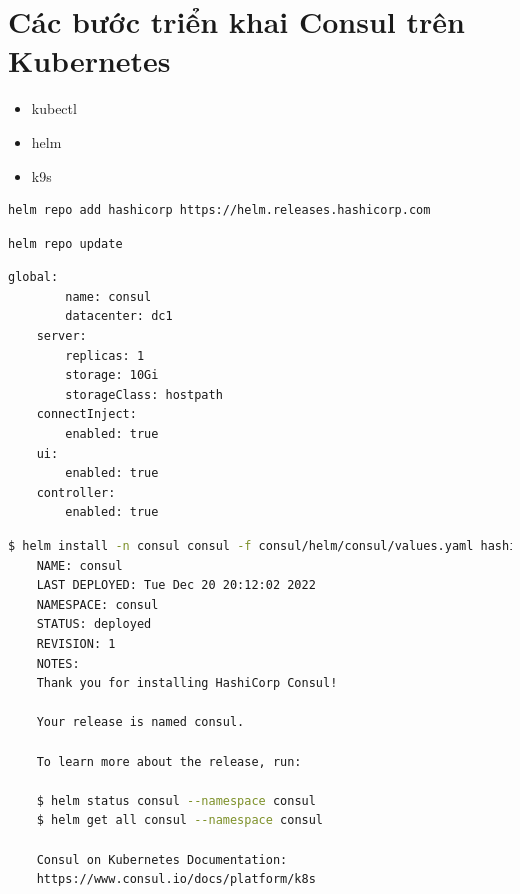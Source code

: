 \documentclass[14pt,a4paper]{report}
\begin{document}
{	\section{Các bước triển khai Consul trên Kubernetes}
	\hspace{1.0cm}{Để triển khai Consul trên Kubernetes, chúng ta sẽ cần phải có những công cụ sau đây:\\}
	\begin{itemize}
		\item kubectl
		\item helm
		\item k9s
	\end{itemize}
	\hspace{0.3cm}{Dưới đây là các câu lệnh để triển khai Consul, chúng ta sẽ sử dụng Chart của Hashicorp cung cấp. Đầu tiên, chúng ta cần phải thêm nguồn chart vào trong dữ liệu Helm của chúng ta với câu lệnh sau:}
	\begin{lstlisting}[language=Bash]
	helm repo add hashicorp https://helm.releases.hashicorp.com
	\end{lstlisting}
	\hspace{1.0cm}{Tiếp theo, chúng ta sẽ cập nhật chart với câu lệnh: }
	\begin{lstlisting}[language=Bash]
	helm repo update
	\end{lstlisting}
	\hspace{1.0cm}{Sau đó, chúng ta tạo một tệp tin có tên là values.yaml, nội dung trong tệp tin như sau: }
	\begin{lstlisting}[language=Bash]
	global:
		name: consul
		datacenter: dc1
	server:
		replicas: 1
		storage: 10Gi
		storageClass: hostpath
	connectInject:
		enabled: true
	ui:
		enabled: true
	controller:
		enabled: true
	\end{lstlisting}
	\hspace{1.0cm}{Sau đó, chúng ta bắt đầu chạy câu lệnh sau:}
	\begin{lstlisting}[language=Bash]
	$ helm install -n consul consul -f consul/helm/consul/values.yaml hashicorp/consul
	NAME: consul
	LAST DEPLOYED: Tue Dec 20 20:12:02 2022   
	NAMESPACE: consul
	STATUS: deployed
	REVISION: 1
	NOTES:
	Thank you for installing HashiCorp Consul!
	
	Your release is named consul.
	
	To learn more about the release, run:     
	
	$ helm status consul --namespace consul 
	$ helm get all consul --namespace consul
	
	Consul on Kubernetes Documentation:       
	https://www.consul.io/docs/platform/k8s   
	

\end{lstlisting}}
\end{document}
